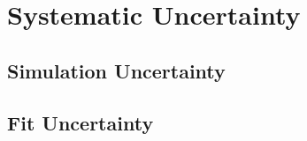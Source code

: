 

\section{ Systematic Uncertainty}
\label{sec:Systematic}

\subsection{Simulation Uncertainty}
\label{ssec:Syst_SimUnc}

\subsection{Fit Uncertainty}
\label{ssec:Syst_FitUnc}


\FloatBarrier
